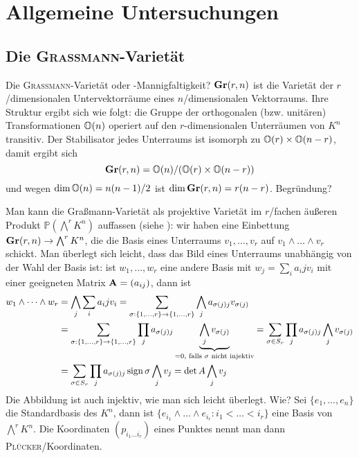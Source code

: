\chapter{Allgemeine Untersuchungen} \label{chap:general}
\section{Die \textsc{Graßmann}-Varietät} \label{sec:grassmann}
Die \textsc{Graßmann}-Varietät \note oder -Mannigfaltigkeit? $\grass r/n$ ist die Varietät der $r$\-/dimensionalen Untervektorräume eines $n$\-/dimensionalen Vektorraums. Ihre Struktur ergibt sich wie folgt: die Gruppe der orthogonalen (bzw. unitären) Transformationen $\mathbb O(n)$ operiert auf den $r$-dimensionalen Unterräumen von $K^n$ transitiv. Der Stabilisator jedes Unterraums ist isomorph zu $\mathbb O(r) \times \mathbb O(n-r)$, damit ergibt sich
\begin{equation}
\grass r/n = \orth n / (\orth r \times \orth{n-r})
\end{equation}
und wegen $\dim \mathbb O(n) = n(n-1)/2$ ist $\dim \grass r/n = r(n-r)$. \note Begründung?

Man kann die Graßmann-Varietät als projektive Varietät im $r$\-/fachen äußeren Produkt $\mathbb P(\bigwedge^r K^n)$ auffassen (siehe \cite[S.~42]{Shafarevich}): wir haben eine Einbettung $\grass r/n \to \bigwedge^r K^n$, die die Basis eines Unterraums $v_1, \dots, v_r$ auf $v_1 \wedge
\dots \wedge v_r$ schickt. Man überlegt sich leicht, dass das Bild eines Unterraums unabhängig von der Wahl der Basis ist: ist $w_1, \dots, w_r$ eine andere Basis mit $w_j = \sum_i a_ij v_i$ mit einer geeigneten Matrix $\mathbf{A} = (a_{ij})$, dann ist
\begin{align*}
w_1 \wedge \dots \wedge w_r &= \bigwedge_j \sum_i a_ij v_i = \sum_{\sigma: \{1,\dots,r\} \rightarrow \{1,\dots,r\}} \bigwedge_j a_{\sigma(j)j} v_{\sigma(j)} \\
	&= \sum_{\sigma: \{1,\dots,r\} \rightarrow \{1,\dots,r\}} \prod_j a_{\sigma(j)j} \underbrace{\bigwedge_j v_{\sigma(j)}}_{= 0,\text{ falls $\sigma$ nicht injektiv}} = \sum_{\sigma \in S_r} \prod_j a_{\sigma(j)j} \bigwedge_j v_{\sigma(j)} \\
	&= \sum_{\sigma \in S_r} \prod_j a_{\sigma(j)j} \operatorname{sign} \sigma \bigwedge_j v_j = \det A \bigwedge_j v_j
\end{align*}
Die Abbildung ist auch injektiv, wie man sich leicht überlegt. \note Wie?
Sei $\{e_1, \dots, e_n\}$ die Standardbasis des $K^n$, dann ist $\{e_{i_1} \wedge \dots \wedge e_{i_r} \colon i_1 < \dots < i_r\}$ eine Basis von $\bigwedge^r K^n$. Die Koordinaten $(p_{i_1 \dots i_r})$ eines Punktes nennt man dann \textsc{Plücker}\-/Koordinaten.

